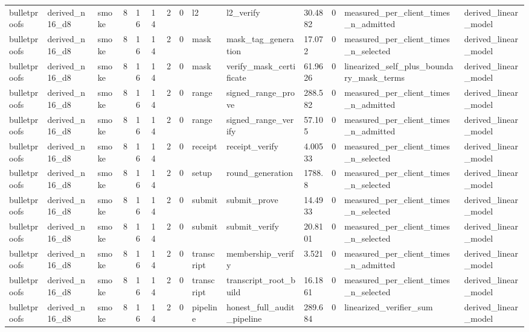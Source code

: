 \begin{table}[t]
\begin{tabular}{llllllllllllll}
bulletproofs & derived\_n16\_d8 & smoke & 8 & 16 & 14 & 2 & 0 & l2 & l2\_verify & 30.4882 & 0 & measured\_per\_client\_times\_n\_admitted & derived\_linear\_model \\
bulletproofs & derived\_n16\_d8 & smoke & 8 & 16 & 14 & 2 & 0 & mask & mask\_tag\_generation & 17.072 & 0 & measured\_per\_client\_times\_n\_selected & derived\_linear\_model \\
bulletproofs & derived\_n16\_d8 & smoke & 8 & 16 & 14 & 2 & 0 & mask & verify\_mask\_certificate & 61.9626 & 0 & linearized\_self\_plus\_boundary\_mask\_terms & derived\_linear\_model \\
bulletproofs & derived\_n16\_d8 & smoke & 8 & 16 & 14 & 2 & 0 & range & signed\_range\_prove & 288.582 & 0 & measured\_per\_client\_times\_n\_admitted & derived\_linear\_model \\
bulletproofs & derived\_n16\_d8 & smoke & 8 & 16 & 14 & 2 & 0 & range & signed\_range\_verify & 57.105 & 0 & measured\_per\_client\_times\_n\_admitted & derived\_linear\_model \\
bulletproofs & derived\_n16\_d8 & smoke & 8 & 16 & 14 & 2 & 0 & receipt & receipt\_verify & 4.00533 & 0 & measured\_per\_client\_times\_n\_selected & derived\_linear\_model \\
bulletproofs & derived\_n16\_d8 & smoke & 8 & 16 & 14 & 2 & 0 & setup & round\_generation & 1788.8 & 0 & measured\_per\_client\_times\_n\_selected & derived\_linear\_model \\
bulletproofs & derived\_n16\_d8 & smoke & 8 & 16 & 14 & 2 & 0 & submit & submit\_prove & 14.4933 & 0 & measured\_per\_client\_times\_n\_selected & derived\_linear\_model \\
bulletproofs & derived\_n16\_d8 & smoke & 8 & 16 & 14 & 2 & 0 & submit & submit\_verify & 20.8101 & 0 & measured\_per\_client\_times\_n\_selected & derived\_linear\_model \\
bulletproofs & derived\_n16\_d8 & smoke & 8 & 16 & 14 & 2 & 0 & transcript & membership\_verify & 3.521 & 0 & measured\_per\_client\_times\_n\_admitted & derived\_linear\_model \\
bulletproofs & derived\_n16\_d8 & smoke & 8 & 16 & 14 & 2 & 0 & transcript & transcript\_root\_build & 16.1861 & 0 & measured\_per\_client\_times\_n\_selected & derived\_linear\_model \\
bulletproofs & derived\_n16\_d8 & smoke & 8 & 16 & 14 & 2 & 0 & pipeline & honest\_full\_audit\_pipeline & 289.684 & 0 & linearized\_verifier\_sum & derived\_linear\_model \\

\end{tabular}
\end{table}
